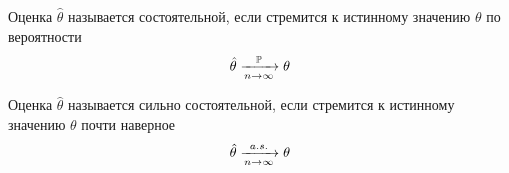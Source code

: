 \begin{definition}
    Оценка $\hat{\theta}$ называется состоятельной,
    если стремится к истинному значению $\theta$ по вероятности
    $$\hat{\theta}\xrightarrow[n\to\infty]{\mathbb{P}}\theta$$
\end{definition}
\begin{definition}
    Оценка $\hat{\theta}$ называется сильно состоятельной,
    если стремится к истинному значению $\theta$ почти наверное
    $$\hat{\theta}\xrightarrow[n\to\infty]{a.s.}\theta$$
\end{definition}
